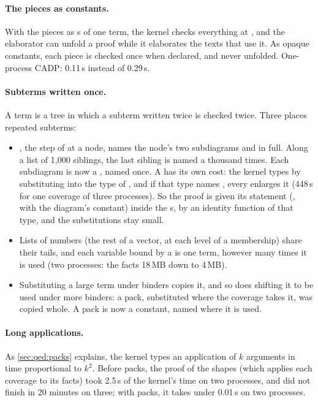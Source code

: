 \paragraph{The pieces as constants.} With the pieces as s of
one term, the kernel checks everything at , and the elaborator
can unfold a proof while it elaborates the texts that use it. As opaque
constants, each piece is checked once when declared, and never unfolded.
One-process CADP:  0.11\,s instead of 0.29\,s.

\paragraph{Subterms written once.} A term is a tree in which a subterm
written twice is checked twice. Three places repeated subterms:
\begin{itemize}
\item {}, the step of  at a node,
  names the node's two subdiagrams  and  in full. Along a
  list of 1,000 siblings, the last sibling is named a thousand times. Each
  subdiagram is now a , named once. A  has its own
  cost: the kernel types  by substituting 
  into the type of , and if that type names , every
   enlarges it (448\,s for one coverage of three processes). So
  the proof is given its statement (, with  the
  diagram's constant) inside the s, by an identity function of
  that type, and the substitutions stay small.
\item Lists of numbers (the rest of a vector, at each level of a
  membership) share their tails, and each variable bound by a 
  is one term, however many times it is used (two processes: the facts
  18\,MB down to 4\,MB).
\item Substituting a large term under binders copies it, and so does
  shifting it to be used under more binders: a pack, substituted where
  the coverage takes it, was copied whole. A pack is now a constant,
  named where it is used.
\end{itemize}

\paragraph{Long applications.} As \cref{sec:qed:packs} explains, the
kernel types an application of $k$ arguments in time proportional to
$k^2$. Before packs, the proof of the shapes (which applies each coverage
to its facts) took 2.5\,s of the kernel's time on two processes, and
did not finish in 20 minutes on three; with packs, it takes under
0.01\,s on two processes.

